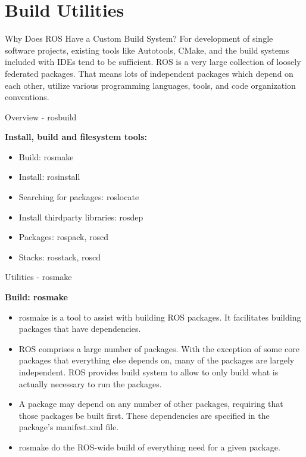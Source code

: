 \documentclass{beamer}
\begin{document}
\section{Build Utilities}
\begin{frame}{Why Does ROS Have a Custom Build System?}
For development of single software projects, existing tools like Autotools, CMake, and the build systems included with IDEs tend to be sufficient.
\newline
\newline
ROS is a very large collection of loosely federated packages. That means lots of independent packages which depend on each other, utilize various programming languages, tools, and code organization conventions.
\end{frame}
\begin{frame}{Overview - rosbuild}
\begin{large}\textbf{Install, build and filesystem tools:}\end{large}

\begin{itemize}
	\item Build: 							rosmake
	\item Install:							rosinstall
	\item Searching for packages:			roslocate
	\item Install thirdparty libraries:		rosdep
	\item Packages:							rospack, roscd
	\item Stacks:							rosstack, roscd
\end{itemize}
\end{frame}
\begin{frame}{Utilities - rosmake}
	
\begin{large}\textbf{Build: rosmake}\end{large}

\begin{itemize}
\item rosmake is a tool to assist with building ROS packages. It facilitates building packages that have dependencies.
\item ROS comprises a large number of packages. With the exception of some core packages that everything else depends on, many of the packages are largely independent. ROS provides build system to allow to only build what is actually necessary to run the packages.
\item A package may depend on any number of other packages, requiring that those packages be built first. These dependencies are specified in the package's manifest.xml file.
\item rosmake do the ROS-wide build of everything need for a given package.
\end{itemize} 
\end{frame}
\end{document}
